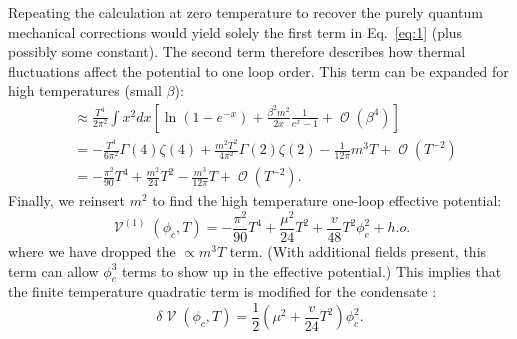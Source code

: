 \documentclass[%
 reprint,
nofootinbib,
 amsmath,amssymb,
 aps,
floatfix,
]{revtex4-1}
\DeclareMathOperator{\BigO}{\mathcal{O}}
\DeclareMathOperator{\V}{\mathcal{V}}
\begin{document}
Repeating the calculation at zero temperature to recover the purely quantum mechanical corrections would yield solely the first term in Eq.~\ref{eq:1} (plus possibly some constant).
The second term therefore describes how thermal fluctuations affect the potential to one loop order.
This term can be expanded for high temperatures (small $\beta$):
\begin{equation}
\begin{split}
    &\approx \frac{T^4}{2\pi^2} \int x^2 dx \left[\ln\left(1-e^{-x}\right) + \frac{\beta^2m^2}{2x}\frac{1}{e^x-1} + \BigO(\beta^4)\right] \\
    &= -\frac{T^4}{6\pi^2}\Gamma(4)\zeta(4) + \frac{m^2 T^2}{4\pi^2} \Gamma(2)\zeta(2) - \frac{1}{12\pi} m^3 T + \BigO(T^{-2}) \\
    &= -\frac{\pi^2}{90}T^4 + \frac{m^2}{24}T^2 - \frac{m^3}{12\pi} T + \BigO(T^{-2}).
\end{split}
\end{equation}
Finally, we reinsert $m^2$ to find the high temperature one-loop effective potential: 
\begin{equation}
    \V^{(1)}(\phi_c, T) = - \frac{\pi^2}{90}T^4 + \frac{\mu^2}{24}T^2 + \frac{v}{48}T^2 \phi_c^2 + h.o.
\end{equation}
where we have dropped the $\propto m^3 T$ term.
(With additional fields present, this term can allow $\phi_c^3$ terms to show up in the effective potential.)
This implies that the finite temperature quadratic term is modified for the condensate \cite{linde05}:
\begin{equation}
    \delta\V (\phi_c, T) = \frac{1}{2}\left(\mu^2 + \frac{v}{24}T^2\right) \phi_c^2.
\end{equation}
\end{document}

